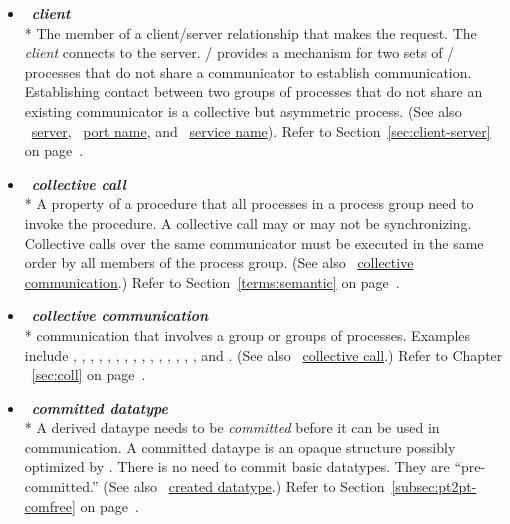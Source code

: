 \begin{itemize}
\label{glossary:client}
\item  ~\hypertarget{glossary:client}{\emph{\textbf{client}}} \\*
The member of a client/server relationship that makes the request. The \emph{client} connects to the server.
 \MPI/ provides a mechanism for two sets of \MPI/  processes that do not share a communicator
to establish communication.
Establishing contact between two groups of processes that do not share an
existing communicator is a collective but asymmetric process.  
(See also ~\hyperlink{glossary:server}{server},  ~\hyperlink{glossary:port_name}{port name},
and ~\hyperlink{glossary:service_name}{service name}). 
Refer to Section~\ref{sec:client-server} on page~\pageref{sec:client-server}.

\label{glossary:collective call}
\item  ~\hypertarget{glossary:collective_call}{\emph{\textbf{collective call}}} \\*
A property of a procedure that all processes in a process group need to invoke the procedure.  A
collective call may or may not be synchronizing.
Collective calls over the same communicator
must be executed in the same order by all members of the process
group.
(See also ~\hyperlink{glossary:collective_communication}{collective communication}.)
Refer to Section~\ref{terms:semantic} on page~\pageref{terms:semantic}.

\label{glossary:collective communication}
\item  ~\hypertarget{glossary:collective_communication}{\emph{\textbf{collective communication}}} \\*
communication that involves a group
or groups of processes. Examples include , ,
, , , ,
, , , ,
, , , ,
, and .
(See also ~\hyperlink{glossary:collective_call}{collective call}.)
Refer to Chapter ~\ref{sec:coll} on page~\pageref{sec:coll}.

\label{glossary:committed_datatype}
\item  ~\hypertarget{glossary:committed_datatype}{\emph{\textbf{committed datatype}}} \\*
A derived dataype needs to
be \emph{committed} before it can be used in
communication. A committed dataype is an opaque structure
possibly optimized by .
There is no need to commit basic datatypes. They are ``pre-committed.''
(See also ~\hyperlink{glossary:created_datatype}{created datatype}.)
Refer to Section~\ref{subsec:pt2pt-comfree} on page~\pageref{subsec:pt2pt-comfree}.


\end{itemize}

